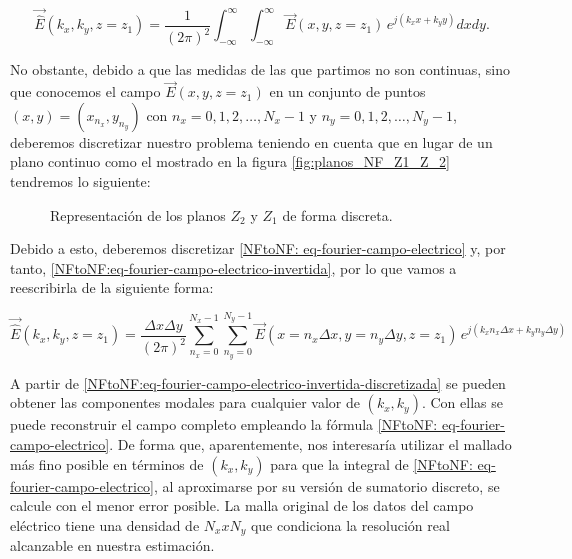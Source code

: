 \begin{equation}
\vec{\hat{E}}(k_{x},k_{y},z=z_{1})=\frac{1}{(2\pi)^{2}}\int_{-\infty}^{\infty}\int_{-\infty}^{\infty}\vec{E}(x,y,z=z_{1})
\,e^{j (k_{x} x+k_{y} y)} dx dy.
\label{NFtoNF:eq-fourier-campo-electrico-invertida}
\end{equation}

\noindent
No obstante, debido a que las medidas de las que partimos no son continuas, sino que conocemos el campo $\vec{E}(x,y,z=z_{1})$ en un conjunto de puntos
$(x,y)=(x_{n_{x}},y_{n_{y}})$ con $n_{x}=0,1,2,\ldots,N_{x}-1$ y
$n_{y}=0,1,2,\ldots,N_{y}-1$, deberemos discretizar nuestro problema teniendo en cuenta que en lugar de un plano continuo como el mostrado en la figura \ref{fig:planos_NF_Z1_Z_2} tendremos lo siguiente: 

\begin{figure}[h]
    \centering
    \caption{Representación de los planos $Z_{2}$ y $Z_{1}$ de forma discreta.}
    \label{fig:planos_NF_Z1_Z_2_discretos}
\end{figure}

\noindent
Debido a esto, deberemos discretizar \eqref{NFtoNF: eq-fourier-campo-electrico} y, por tanto,  \eqref{NFtoNF:eq-fourier-campo-electrico-invertida}, por lo que vamos a reescribirla de la siguiente forma:

\begin{equation}
\vec{\hat{E}}(k_{x},k_{y},z=z_{1})=\frac{\Delta x
\Delta y}{(2\pi)^{2}}
\sum_{n_{x}=0}^{N_{x}-1}\sum_{n_{y}=0}^{N_{y}-1}\vec{E}(x=n_{x}\Delta
x,y=n_{y} \Delta y,z=z_{1}) \,e^{j (k_{x} n_{x} \Delta x+k_{y} n_{y}
\Delta y)}
\label{NFtoNF:eq-fourier-campo-electrico-invertida-discretizada}
\end{equation}

\newpage

A partir de \eqref{NFtoNF:eq-fourier-campo-electrico-invertida-discretizada} se pueden obtener las componentes modales para cualquier valor de $(k_{x},k_{y})$. Con ellas se puede reconstruir el campo completo empleando la fórmula \eqref{NFtoNF: eq-fourier-campo-electrico}. De forma que, aparentemente, nos interesaría utilizar el mallado más fino posible en términos de $(k_{x},k_{y})$ para que la integral de \eqref{NFtoNF: eq-fourier-campo-electrico}, al aproximarse por su versión de sumatorio discreto, se calcule con el menor error posible. La malla original de los datos del campo eléctrico tiene una densidad de $N_{x} x N_{y}$ que condiciona la resolución real alcanzable en nuestra estimación.\\

